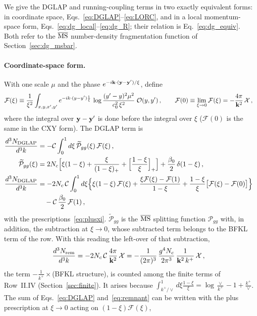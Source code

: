 We give the DGLAP and running-coupling terms in two exactly equivalent forms: in coordinate space, Eqs.~\eqref{eq:DGLAP}--\eqref{eq:LORC}, and in a local momentum-space form, Eqs.~\eqref{eq:dg_local}--\eqref{eq:dg_R}; their relation is Eq.~\eqref{eq:dg_equiv}. Both refer to the $\overline{\rm MS}$ number-density fragmentation function of Section~\ref{sec:dg_msbar}.

\paragraph{Coordinate-space form.} With one scale $\mu$ and the phase $e^{-i\mathbf{k}\cdot(\mathbf{y}-\mathbf{y}')/\xi}$, define
\begin{align}\label{eq:dg_F}
\mathcal F(\xi)\equiv\frac{1}{\xi^2}\int_{x,y,x',y'}e^{-ik\cdot(y-y')\frac1\xi}\,\log\frac{(y'-y)^2\mu^2}{c_0^2\,\xi^2}\;\mathcal O(y,y')\,,\qquad
\mathcal F(0)\equiv\lim_{\xi\to0}\mathcal F(\xi)=-\frac{4\pi}{\mathbf{k}^2}\,\mathcal X\,,
\end{align}
where the integral over $\mathbf{y}-\mathbf{y}'$ is done before the integral over $\xi$ ($\mathcal F(0)$ is the same in the CXY form). The DGLAP term is
\begin{align}\label{eq:DGLAP}
\frac{d^3N_{\rm DGLAP}}{d^3k}&=-\mathcal C\int_0^1d\xi\,\widetilde{\mathcal P}_{gg}(\xi)\,\mathcal F(\xi)\,,\notag\\
\widetilde{\mathcal P}_{gg}(\xi)&=2N_c\Big[\xi(1-\xi)+\frac{\xi}{(1-\xi)_+}+\Big[\frac{1-\xi}{\xi}\Big]_+\Big]+\frac{\beta_0}{2}\,\delta(1-\xi)\,,\notag\\
\frac{d^3N_{\rm DGLAP}}{d^3k}&=-2N_c\,\mathcal C\int_0^1d\xi\Big\{\xi(1-\xi)\,\mathcal F(\xi)+\frac{\xi\mathcal F(\xi)-\mathcal F(1)}{1-\xi}+\frac{1-\xi}{\xi}\big[\mathcal F(\xi)-\mathcal F(0)\big]\Big\}\notag\\&\quad-\mathcal C\,\frac{\beta_0}{2}\,\mathcal F(1)\,,
\end{align}
with the prescriptions~\eqref{eq:plusxi}. $\widetilde{\mathcal P}_{gg}$ is the $\overline{\rm MS}$ splitting function $\mathcal P_{gg}$ with, in addition, the subtraction at $\xi\to0$, whose subtracted term belongs to the BFKL term of the row. With this reading the left-over of that subtraction,
\begin{align}\label{eq:remnant}
\frac{d^3N_{\rm rem}}{d^3k}=-2N_c\,\mathcal C\,\frac{4\pi}{\mathbf{k}^2}\,\mathcal X=-\frac{1}{(2\pi)^3}\,\frac{g^4N_c}{2\pi^3}\,\frac{1}{\mathbf{k}^2\,k^+}\,\mathcal X\,,
\end{align}
the term $-\frac{1}{k^+}\times$(BFKL structure), is counted among the finite terms of Row~II.IV (Section~\ref{sec:finite}). It arises because $\int_{k^+/\vee}^1d\xi\frac{1-\xi}{\xi}=\log\frac{\vee}{k^+}-1+\frac{k^+}{\vee}$. The sum of Eqs.~\eqref{eq:DGLAP} and~\eqref{eq:remnant} can be written with the plus prescription at $\xi\to0$ acting on $(1-\xi)\mathcal F(\xi)$,

